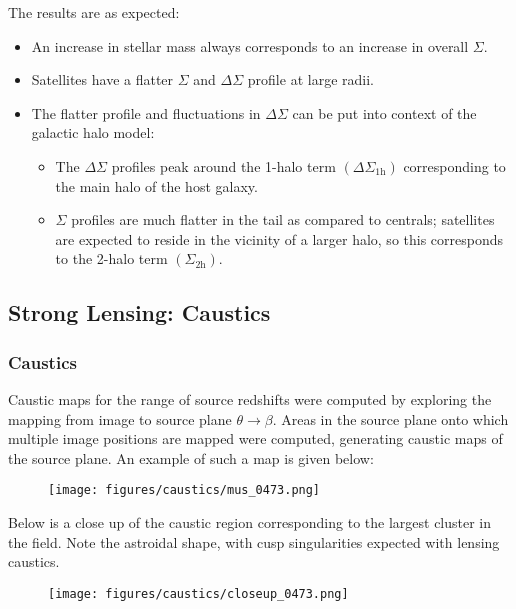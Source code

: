 \documentclass{beamer}
\begin{document}
  \begin{frame}
    The results are as expected:
    \begin{itemize}
      \item An increase in stellar mass always corresponds to an increase in overall $\Sigma.$
      \item Satellites have a flatter $\Sigma$ and $\Delta\Sigma$ profile at large radii.
      \item The flatter profile and fluctuations in $\Delta\Sigma$ can be put into context of the galactic halo model:
      \begin{itemize}
        \item The $\Delta\Sigma$ profiles peak around the 1-halo term $\left( \Delta\Sigma_{\text{1h}} \right)$ corresponding to the main halo of the host galaxy.
        \item $\Sigma$ profiles are much flatter in the tail as compared to centrals; satellites are expected to reside in the vicinity of a larger halo, so this corresponds to the 2-halo term $\left( \Sigma_{\text{2h}} \right)$.
      \end{itemize}
    \end{itemize}
  \end{frame}

  \subsection{Strong Lensing: Caustics}

  \begin{frame}
    \frametitle{\sc Caustics}
    Caustic maps for the range of source redshifts were computed by exploring the mapping from image to source plane $\theta \rightarrow \beta$. Areas in the source plane onto which multiple image positions are mapped were computed, generating caustic maps of the source plane. An example of such a map is given below:

    \begin{figure}
      \centering
      \texttt{[image: figures/caustics/mus\_0473.png]}
    \end{figure}
  \end{frame}

  \begin{frame}
    Below is a close up of the caustic region corresponding to the largest cluster in the field. Note the astroidal shape, with cusp singularities expected with lensing caustics.

    \begin{figure}
      \centering
      \texttt{[image: figures/caustics/closeup\_0473.png]}
    \end{figure}
  \end{frame}
\end{document}
